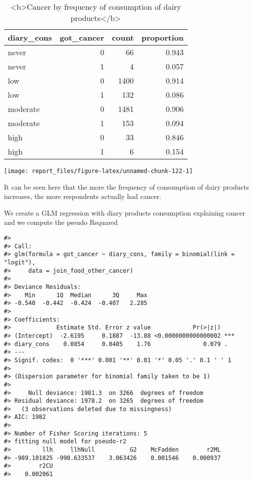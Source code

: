 \documentclass[
]{article}
\begin{document}
\begin{table}

\caption{\label{tab:unnamed-chunk-121}<b>Cancer by frequency of consumption of dairy products</b>}
\centering
\begin{tabular}[t]{l|r|r|r}
\hline
diary\_cons & got\_cancer & count & proportion\\
\hline
never & 0 & 66 & 0.943\\
\hline
never & 1 & 4 & 0.057\\
\hline
low & 0 & 1400 & 0.914\\
\hline
low & 1 & 132 & 0.086\\
\hline
moderate & 0 & 1481 & 0.906\\
\hline
moderate & 1 & 153 & 0.094\\
\hline
high & 0 & 33 & 0.846\\
\hline
high & 1 & 6 & 0.154\\
\hline
\end{tabular}
\end{table}

\begin{center}\texttt{[image: report\_files/figure-latex/unnamed-chunk-122-1]} \end{center}

It can be seen here that the more the frequency of consumption of dairy
products increases, the more respondents actually had cancer.

We create a GLM regression with diary products consumption explaining
cancer and we compute the pseudo Rsquared

\begin{verbatim}
#> 
#> Call:
#> glm(formula = got_cancer ~ diary_cons, family = binomial(link = "logit"), 
#>     data = join_food_other_cancer)
#> 
#> Deviance Residuals: 
#>    Min      1Q  Median      3Q     Max  
#> -0.540  -0.442  -0.424  -0.407   2.285  
#> 
#> Coefficients:
#>             Estimate Std. Error z value            Pr(>|z|)    
#> (Intercept)  -2.6195     0.1887  -13.88 <0.0000000000000002 ***
#> diary_cons    0.0854     0.0485    1.76               0.079 .  
#> ---
#> Signif. codes:  0 '***' 0.001 '**' 0.01 '*' 0.05 '.' 0.1 ' ' 1
#> 
#> (Dispersion parameter for binomial family taken to be 1)
#> 
#>     Null deviance: 1981.3  on 3266  degrees of freedom
#> Residual deviance: 1978.2  on 3265  degrees of freedom
#>   (3 observations deleted due to missingness)
#> AIC: 1982
#> 
#> Number of Fisher Scoring iterations: 5
#> fitting null model for pseudo-r2
#>         llh     llhNull          G2    McFadden        r2ML 
#> -989.101825 -990.633537    3.063426    0.001546    0.000937 
#>        r2CU 
#>    0.002061
\end{verbatim}
\end{document}
